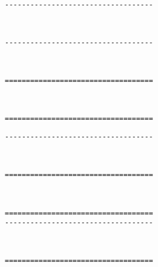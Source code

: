 \

\goodbreak \begin{samepage} \small \begin{verbatim}
-----------------------------------
\end{verbatim} \normalsize \end{samepage}

\

\goodbreak \begin{samepage} \small \begin{verbatim}
-----------------------------------
\end{verbatim} \normalsize \end{samepage}

\

\goodbreak \begin{samepage} \small \begin{verbatim}
===================================
\end{verbatim} \normalsize \end{samepage}

\

\goodbreak \begin{samepage} \small \begin{verbatim}
===================================
\end{verbatim} \end{samepage} \goodbreak \begin{samepage} \begin{verbatim}
-----------------------------------
\end{verbatim} \normalsize \end{samepage}

\

\goodbreak \begin{samepage} \small \begin{verbatim}
===================================
\end{verbatim} \normalsize \end{samepage}

\

\goodbreak \begin{samepage} \small \begin{verbatim}
===================================
-----------------------------------
\end{verbatim} \normalsize \end{samepage}

\

\goodbreak \begin{samepage} \small \begin{verbatim}
===================================
\end{verbatim} \normalsize \end{samepage}

